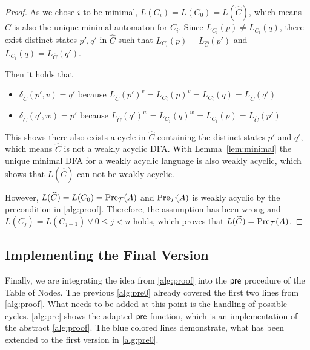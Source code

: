\begin{proof}
As we chose $i$ to be minimal, $L(C_{i}) = L(C_{0}) = L(\widehat{C})$, which means $\widehat{C}$ is also the unique minimal automaton for $C_{i}$. Since $L_{C_{i}}(p) \neq L_{C_{i}}(q)$, there exist distinct states $p',q'$ in $\widehat{C}$ such that $L_{C_{i}}(p) = L_{\widehat{C}}(p')$ and $L_{C_{i}}(q) = L_{\widehat{C}}(q')$. 

Then it holds that
\begin{itemize}[-,noitemsep]
\item $\delta_{\widehat{C}}(p',v) = q'$ because $L_{\widehat{C}}(p')^{v} = L_{C_{i}}(p)^{v} = L_{C_{i}}(q) = L_{\widehat{C}}(q')$
\item $\delta_{\widehat{C}}(q',w) = p'$ because
$L_{\widehat{C}}(q')^{w} = L_{C_{i}}(q)^{w} = L_{C_{i}}(p) = L_{\widehat{C}}(p')$
\end{itemize}
%

This shows there also exists a cycle in $\widehat{C}$ containing the distinct states $p'$ and $q'$, which means $\widehat{C}$ is not a weakly acyclic DFA. 
With Lemma~\autoref{lem:minimal} the unique minimal DFA for a weakly acyclic language is also weakly acyclic, which shows that $L(\widehat{C})$ can not be weakly acyclic.

However, $L(\widehat{C}) = L(C_{0}) = \operatorname{\text{Pre}}_{\mathcal{T}}(A)$ and $\operatorname{\text{Pre}}_{\mathcal{T}}(A)$ is weakly acyclic by the precondition in \autoref{alg:proof}. Therefore, the assumption has been wrong and $L(C_{j}) = L(C_{j+1}) \ \forall \ 0 \le j < n$ holds, which proves that $L(\widetilde{C}) = \operatorname{\text{Pre}}_{\mathcal{T}}(A)$. 



\end{proof}

\subsection{Implementing the Final Version}
Finally, we are integrating the idea from \autoref{alg:proof} into the $\operatorname{\textsf{pre}}$ procedure of the Table of Nodes. The previous \autoref{alg:pre0} already covered the first two lines from \autoref{alg:proof}. What needs to be added at this point is the handling of possible cycles.
\autoref{alg:pre} shows the adapted $\operatorname{\textsf{pre}}$ function, which is an implementation of the abstract \autoref{alg:proof}. The blue colored lines demonstrate, what has been extended to the first version in \autoref{alg:pre0}.


